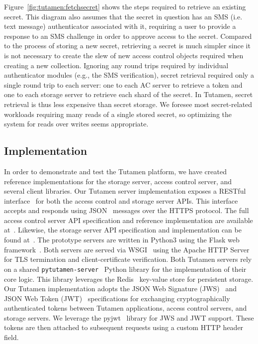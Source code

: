 Figure~\ref{fig:tutamen:fetchsecret} shows the steps required to
retrieve an existing secret. This diagram also assumes that the secret
in question has an SMS (i.e. text message) authenticator associated
with it, requiring a user to provide a response to an SMS challenge in
order to approve access to the secret. Compared to the process of
storing a new secret, retrieving a secret is much simpler since it is
not necessary to create the slew of new access control objects
required when creating a new collection. Ignoring any round trips
required by individual authenticator modules (e.g., the SMS
verification), secret retrieval required only a single round trip to
each server: one to each AC server to retrieve a token and one to each
storage server to retrieve each shard of the secret. In Tutamen,
secret retrieval is thus less expensive than secret storage. We
foresee most secret-related workloads requiring many reads of a single
stored secret, so optimizing the system for reads over writes seems
appropriate.

\subsection{Implementation}

In order to demonstrate and test the Tutamen platform, we have created
reference implementations for the storage server, access control
server, and several client libraries. Our Tutamen server
implementation exposes a RESTful interface~\cite{fielding2000} for
both the access control and storage server APIs. This interface
accepts and responds using JSON~\cite{json} messages over the HTTPS
protocol. The full access control server API specification and
reference implementation are available
at~\cite{src-tutamen-apiaccesscontrol}. Likewise, the storage server
API specification and implementation can be found
at~\cite{src-tutamen-apistorage}. The prototype servers are written in
Python3 using the Flask web framework~\cite{python-flask}. Both
servers are served via WSGI~\cite{pep3333} using the Apache HTTP
Server~\cite{apache} for TLS termination and client-certificate
verification. Both Tutamen servers rely on a shared
\texttt{pytutamen-server}~\cite{src-tutamen-pytutamenserver} Python
library for the implementation of their core logic. This library
leverages the Redis~\cite{redis} key-value store for persistent
storage. Our Tutamen implementation adopts the JSON Web Signature
(JWS)~\cite{rfc7515} and JSON Web Token (JWT)~\cite{rfc7519}
specifications for exchanging cryptographically authenticated tokens
between Tutamen applications, access control servers, and storage
servers. We leverage the pyjwt~\cite{pyjwt} library for JWS and JWT
support. These tokens are then attached to subsequent requests using a
custom HTTP header field.

